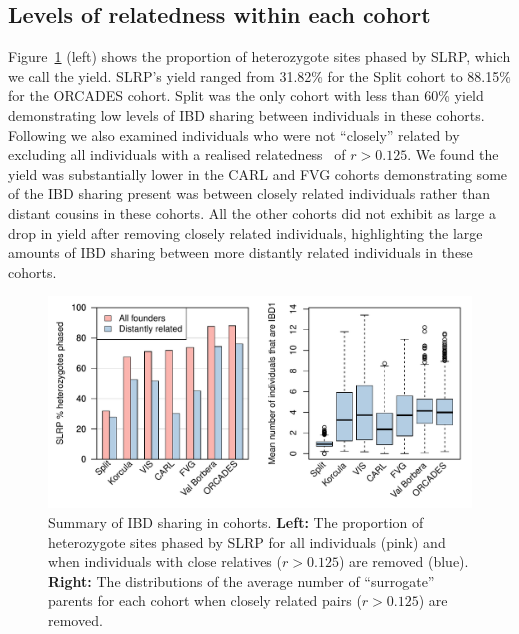 \subsection{Levels of relatedness within each cohort}
Figure~\ref{fig:ibd_summary} (left) shows the proportion of heterozygote sites phased by SLRP, which we call the yield. SLRP's yield ranged from 31.82\% for the Split cohort to 88.15\% for the ORCADES cohort.  Split was the only cohort with less than 60\% yield demonstrating low levels of  IBD sharing between individuals in these cohorts. Following \cite{palin2011identity} we also examined individuals who were not ``closely'' related by excluding all individuals with a realised relatedness~\citep{hayes2009increased} of $r>0.125$. We found the yield was substantially lower in the CARL and FVG cohorts demonstrating some of the IBD sharing present was between closely related individuals rather than distant cousins in these cohorts. All the other cohorts did not exhibit as large a drop in yield after removing closely related individuals, highlighting the  large amounts of IBD sharing between more distantly related individuals in these cohorts. 
\vspace{10pt}
\begin{figure}[h]
 \begin{center} 
  \includegraphics[width=\textwidth]{chap4figs/ibd_summary}
   \caption[ Summary of IBD sharing in cohorts]{ Summary of IBD sharing in cohorts.  \textbf{Left:} The proportion of heterozygote sites phased by SLRP for all individuals (pink) and when individuals with close relatives ($r>0.125$) are removed (blue). \textbf{Right:} The distributions of the average number  of ``surrogate'' parents for each cohort when closely related pairs ($r>0.125$) are removed.\label{fig:ibd_summary}}
 \end{center} 
\end{figure}
\clearpage
